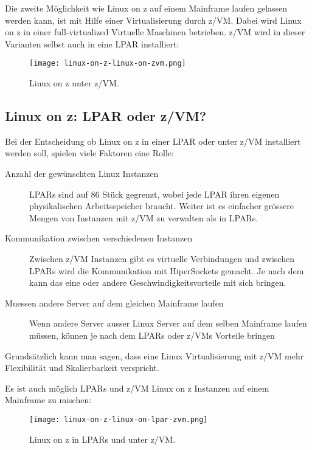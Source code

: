 Die zweite Möglichkeit wie Linux on z auf einem Mainframe laufen gelassen werden kann, ist mit Hilfe einer Virtualisierung durch z/VM. Dabei wird Linux on z in einer full-virtualized Virtuelle Maschinen betrieben. z/VM wird in dieser Varianten selbst auch in eine LPAR installiert:

\begin{figure}[h!]
\centering
\texttt{[image: linux-on-z-linux-on-zvm.png]}
\caption{Linux on z unter z/VM\cite{LinuxOnZOnZVM}.}
\label{fig:LinuxOnZOnZVM}
\end{figure}

\newpage

\subsection{Linux on z: LPAR oder z/VM?}

Bei der Entscheidung ob Linux on z in einer LPAR oder unter z/VM installiert werden soll, spielen viele Faktoren eine Rolle:

\begin{description}
    \item[Anzahl der gewünschten Linux Instanzen]{LPARs sind auf 86 Stück gegrenzt, wobei jede LPAR ihren eigenen physikalischen Arbeitsspeicher braucht. Weiter ist es einfacher grössere Mengen von Instanzen mit z/VM zu verwalten als in LPARs.}
    \item[Kommunikation zwischen verschiedenen Instanzen]{Zwischen z/VM Instanzen gibt es virtuelle Verbindungen und zwischen LPARs wird die Kommunikation mit HiperSockets gemacht. Je nach dem kann das eine oder andere Geschwindigkeitsvorteile mit sich bringen.}
    \item[Muessen andere Server auf dem gleichen Mainframe laufen]{Wenn andere Server ausser Linux Server auf dem selben Mainframe laufen müssen, können je nach dem LPARs oder z/VMs Vorteile bringen}
\end{description}

Grundsätzlich kann man sagen, dass eine Linux Virtualisierung mit z/VM mehr Flexibilität und Skalierbarkeit verspricht.\cite{IBMzVMLPAR}

Es ist auch möglich LPARs und z/VM Linux on z Instanzen auf einem Mainframe zu mischen:

\begin{figure}[ht!]
\centering
\texttt{[image: linux-on-z-linux-on-lpar-zvm.png]}
\caption{Linux on z in LPARs und unter z/VM\cite{LinuxOnZOnLPARZVM}.}
\label{fig:LinuxOnZOnLPARZVM}
\end{figure}
